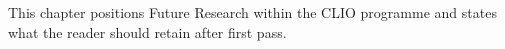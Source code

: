 This chapter positions Future Research within the CLIO programme and states what the reader should retain after first pass.
